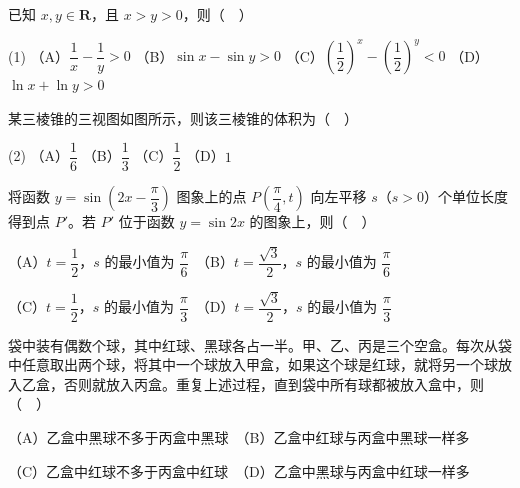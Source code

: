 \begin{question}
已知 \(x,y\in\mathbf{R}\)，且 \(x>y>0\)，则（　）

\begin{gkopts}(1)
\task （A）\(\dfrac{1}{x}-\dfrac{1}{y}>0\)
\task （B）\(\sin x-\sin y>0\)
\task （C）\(\left(\dfrac{1}{2}\right)^{x}-\left(\dfrac{1}{2}\right)^{y}<0\)
\task （D）\(\ln x+\ln y>0\)
\end{gkopts}

\Needspace{0.4\textheight}
\end{question}
\begin{question}
某三棱锥的三视图如图所示，则该三棱锥的体积为（　）
\nopagebreak[4]
\begin{center}\end{center}
\nopagebreak[4]
\begin{gkopts}(2)
\task （A）\(\dfrac{1}{6}\)
\task （B）\(\dfrac{1}{3}\)
\task （C）\(\dfrac{1}{2}\)
\task （D）\(1\)
\end{gkopts}

\end{question}
\begin{question}
将函数 \(y=\sin\left(2x-\dfrac{\pi}{3}\right)\) 图象上的点 \(P\left(\dfrac{\pi}{4},t\right)\) 向左平移 \(s\)（\(s>0\)）个单位长度得到点 \(P'\)。若 \(P'\) 位于函数 \(y=\sin 2x\) 的图象上，则（　）

（A）\(t=\dfrac{1}{2}\)，\(s\) 的最小值为 \(\dfrac{\pi}{6}\)　（B）\(t=\dfrac{\sqrt{3}}{2}\)，\(s\) 的最小值为 \(\dfrac{\pi}{6}\)

（C）\(t=\dfrac{1}{2}\)，\(s\) 的最小值为 \(\dfrac{\pi}{3}\)　（D）\(t=\dfrac{\sqrt{3}}{2}\)，\(s\) 的最小值为 \(\dfrac{\pi}{3}\)

\end{question}
\begin{question}
袋中装有偶数个球，其中红球、黑球各占一半。甲、乙、丙是三个空盒。每次从袋中任意取出两个球，将其中一个球放入甲盒，如果这个球是红球，就将另一个球放入乙盒，否则就放入丙盒。重复上述过程，直到袋中所有球都被放入盒中，则（　）

（A）乙盒中黑球不多于丙盒中黑球　（B）乙盒中红球与丙盒中黑球一样多

（C）乙盒中红球不多于丙盒中红球　（D）乙盒中黑球与丙盒中红球一样多

\end{question}

